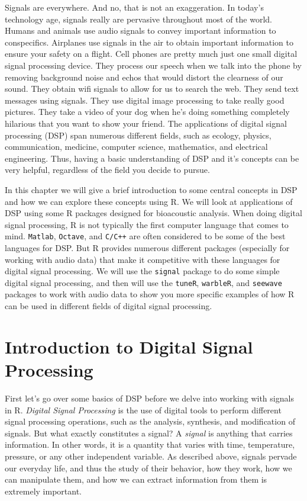 \documentclass[]{krantz}
\begin{document}
Signals are everywhere. And no, that is not an exaggeration. In today's
technology age, signals really are pervasive throughout most of the
world. Humans and animals use audio signals to convey important
information to conspecifics. Airplanes use signals in the air to obtain
important information to ensure your safety on a flight. Cell phones are
pretty much just one small digital signal processing device. They
process our speech when we talk into the phone by removing background
noise and echos that would distort the clearness of our sound. They
obtain wifi signals to allow for us to search the web. They send text
messages using signals. They use digital image processing to take really
good pictures. They take a video of your dog when he's doing something
completely hilarious that you want to show your friend. The applications
of digital signal processing (DSP) span numerous different fields, such
as ecology, physics, communication, medicine, computer science,
mathematics, and electrical engineering. Thus, having a basic
understanding of DSP and it's concepts can be very helpful, regardless
of the field you decide to pursue.

In this chapter we will give a brief introduction to some central
concepts in DSP and how we can explore these concepts using R. We will
look at applications of DSP using some R packages designed for
bioacoustic analysis. When doing digital signal processing, R is not
typically the first computer language that comes to mind.
\texttt{Matlab}, \texttt{Octave}, and \texttt{C/C++} are often
considered to be some of the best languages for DSP. But R provides
numerous different packages (especially for working with audio data)
that make it competitive with these languages for digital signal
processing. We will use the \texttt{signal} package to do some simple
digital signal processing, and then will use the \texttt{tuneR},
\texttt{warbleR}, and \texttt{seewave} packages to work with audio data
to show you more specific examples of how R can be used in different
fields of digital signal processing.

\section{Introduction to Digital Signal
Processing}\label{introduction-to-digital-signal-processing}

First let's go over some basics of DSP before we delve into working with
signals in R. \emph{Digital Signal Processing} is the use of digital
tools to perform different signal processing operations, such as the
analysis, synthesis, and modification of signals. But what exactly
constitutes a signal? A \emph{signal} is anything that carries
information. In other words, it is a quantity that varies with time,
temperature, pressure, or any other independent variable. As described
above, signals pervade our everyday life, and thus the study of their
behavior, how they work, how we can manipulate them, and how we can
extract information from them is extremely important.
\end{document}
